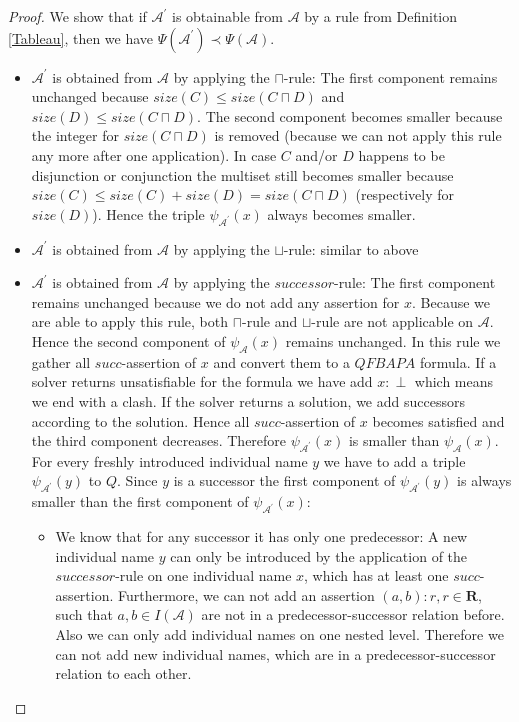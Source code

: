 \documentclass{book}
\theoremstyle{break}
\theoremstyle{definition}
\begin{document}
\begin{proof}
We show that if $\mathcal{A}^\prime$ is obtainable from $\mathcal{A}$ by a rule from Definition \ref{Tableau}, then we have $\Psi(\mathcal{A}^\prime)\prec \Psi(\mathcal{A})$.\\
\begin{itemize}
\item $\mathcal{A}^\prime$ is obtained from $\mathcal{A}$ by applying the $\sqcap$-rule: The first component remains unchanged because $size(C)\leq size(C\sqcap D)$ and $size(D)\leq size(C\sqcap D)$. The second component becomes smaller because the integer for $size(C\sqcap D)$ is removed (because we can not apply this rule any more after one application). In case $C$ and/or $D$ happens to be disjunction or conjunction the multiset still becomes smaller because $size(C)\leq size(C)+size(D)=size(C\sqcap D)$ (respectively for $size(D)$). Hence the triple $\psi_{\mathcal{A}^\prime}(x)$ always becomes smaller.
\item $\mathcal{A}^\prime$ is obtained from $\mathcal{A}$ by applying the $\sqcup$-rule: similar to above
\item $\mathcal{A}^\prime$ is obtained from $\mathcal{A}$ by applying the $successor$-rule: The first component remains unchanged because we do not add any assertion for $x$.  Because we are able to apply this rule, both $\sqcap$-rule and $\sqcup$-rule are not applicable on $\mathcal{A}$. Hence the second component of $\psi_\mathcal{A}(x)$ remains unchanged. In this rule we gather all $succ$-assertion of $x$ and convert them to a $QFBAPA$ formula. If a solver returns unsatisfiable for the formula we have add $x:\perp$ which means we end with a clash. If the solver returns a solution, we add successors according to the solution. Hence all $succ$-assertion of $x$ becomes satisfied and the third component decreases. Therefore $\psi_{\mathcal{A}^\prime}(x)$ is smaller than $\psi_\mathcal{A}(x)$.\\
For every freshly introduced individual name $y$ we have to add a triple $\psi_{\mathcal{A}^\prime}(y)$ to $Q$. Since $y$ is a successor the first component of $\psi_{\mathcal{A}^\prime}(y)$ is always smaller than the first component of $\psi_{\mathcal{A}^\prime}(x)$:
\begin{itemize}
\item We know that for any successor it has only one predecessor: A new individual name $y$ can only be introduced by the application of the $successor$-rule on one individual name $x$, which has at least one $succ$-assertion. Furthermore, we can not add an assertion $(a,b):r,r\in\mathbf{R}$, such that $a,b\in I(\mathcal{A})$ are not in a predecessor-successor relation before. Also we can only add individual names on one nested level. Therefore we can not add new individual names, which are in a predecessor-successor relation to each other.

\end{itemize}
\end{itemize}
\end{proof}
\end{document}
